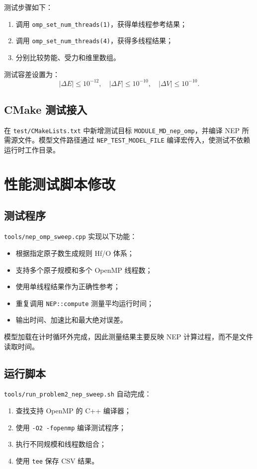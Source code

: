 \documentclass[11pt,a4paper,fontset=fandol]{ctexart}
\begin{document}
测试步骤如下：
\begin{enumerate}
  \item 调用 \texttt{omp\_set\_num\_threads(1)}，获得单线程参考结果；
  \item 调用 \texttt{omp\_set\_num\_threads(4)}，获得多线程结果；
  \item 分别比较势能、受力和维里数组。
\end{enumerate}

测试容差设置为：
\[
|\Delta E| \le 10^{-12}, \quad
|\Delta F| \le 10^{-10}, \quad
|\Delta V| \le 10^{-10}.
\]

\subsection{CMake 测试接入}

在 \texttt{test/CMakeLists.txt} 中新增测试目标
\texttt{MODULE\_MD\_nep\_omp}，并编译 NEP 所需源文件。模型文件路径通过
\texttt{NEP\_TEST\_MODEL\_FILE} 编译宏传入，使测试不依赖运行时工作目录。

\section{性能测试脚本修改}

\subsection{测试程序}

\texttt{tools/nep\_omp\_sweep.cpp} 实现以下功能：
\begin{itemize}
  \item 根据指定原子数生成规则 Hf/O 体系；
  \item 支持多个原子规模和多个 OpenMP 线程数；
  \item 使用单线程结果作为正确性参考；
  \item 重复调用 \texttt{NEP::compute} 测量平均运行时间；
  \item 输出时间、加速比和最大绝对误差。
\end{itemize}

模型加载在计时循环外完成，因此测量结果主要反映 NEP 计算过程，而不是文件读取时间。

\subsection{运行脚本}

\texttt{tools/run\_problem2\_nep\_sweep.sh} 自动完成：
\begin{enumerate}
  \item 查找支持 OpenMP 的 C++ 编译器；
  \item 使用 \texttt{-O2 -fopenmp} 编译测试程序；
  \item 执行不同规模和线程数组合；
  \item 使用 \texttt{tee} 保存 CSV 结果。
\end{enumerate}
\end{document}
